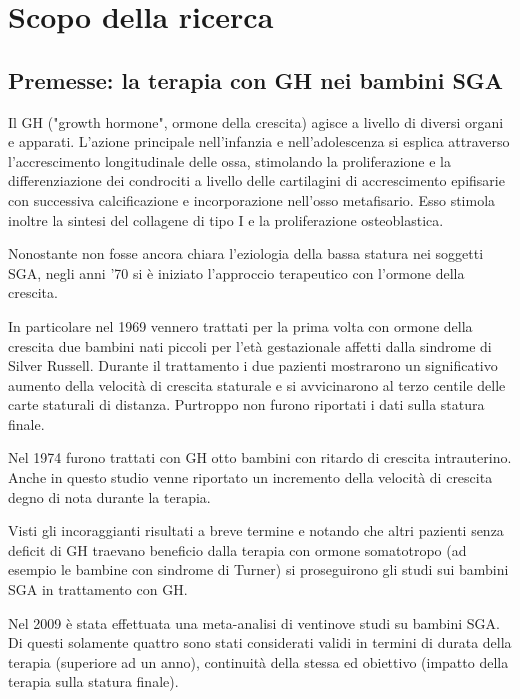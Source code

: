  \chapter{Scopo della ricerca}

\section{Premesse: la terapia con GH nei bambini SGA}


Il GH ("growth hormone", ormone della crescita) agisce a livello di diversi organi e apparati.
L'azione principale nell'infanzia e nell'adolescenza si esplica attraverso l'accrescimento
longitudinale delle ossa, stimolando la proliferazione e la differenziazione dei condrociti
a livello delle cartilagini di accrescimento epifisarie con successiva calcificazione
e incorporazione nell'osso metafisario. Esso stimola inoltre la sintesi del collagene 
di tipo I e la proliferazione osteoblastica.\cite{sga}


Nonostante non fosse ancora chiara l'eziologia della bassa statura nei soggetti SGA,
negli anni '70 si è iniziato l'approccio terapeutico con l'ormone della crescita.

In particolare nel 1969 vennero trattati per la prima volta con ormone della crescita  due bambini nati piccoli per l'età gestazionale affetti dalla sindrome di Silver Russell. Durante il trattamento i due pazienti mostrarono un significativo aumento della velocità di crescita staturale e si avvicinarono al terzo centile delle carte staturali di distanza. Purtroppo non furono riportati i dati sulla statura finale.%

Nel 1974 furono trattati con GH otto bambini con ritardo di crescita intrauterino. Anche in questo studio venne riportato un incremento della velocità di crescita degno di nota durante la terapia.%


Visti gli incoraggianti risultati a breve termine e notando che altri pazienti senza deficit di GH traevano beneficio dalla terapia con ormone somatotropo (ad esempio le bambine con sindrome di Turner)%
si proseguirono gli studi sui bambini SGA in trattamento con GH.


Nel 2009 è stata effettuata una meta-analisi di ventinove studi su bambini SGA. Di questi solamente quattro sono stati considerati validi in termini di durata della terapia (superiore ad un anno), continuità della stessa ed obiettivo (impatto della terapia sulla statura finale).%

